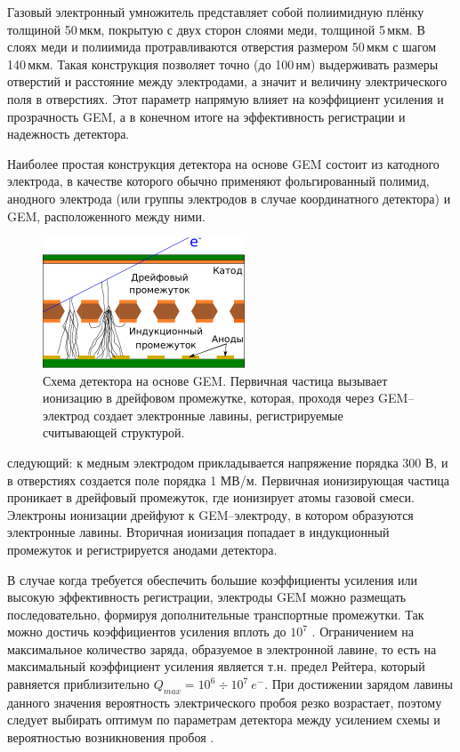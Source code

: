  Газовый электронный умножитель представляет собой полиимидную плёнку толщиной 50\,мкм, покрытую с двух сторон слоями меди, толщиной 5\,мкм. В слоях меди и полиимида протравливаются отверстия размером 50\,мкм с шагом 140\,мкм. Такая конструкция позволяет точно (до 100\,нм) выдерживать размеры отверстий и расстояние между электродами, а значит и величину электрического поля в отверстиях. Этот параметр напрямую влияет на коэффициент усиления и прозрачность GEM, а в конечном итоге на эффективность регистрации и надежность детектора.
 \par Наиболее простая конструкция детектора на основе  GEM состоит из катодного электрода, в качестве которого обычно применяют фольгированный полимид, анодного электрода (или группы электродов в случае координатного детектора) и GEM, расположенного между ними.
 \begin{figure}[h]
	\centering
	\includegraphics[height = 4 cm, width= 6cm]{img/GEM_scheme.pdf}
	\caption{Схема детектора на основе GEM. Первичная частица вызывает ионизацию в дрейфовом промежутке, которая, проходя через GEM--электрод создает электронные лавины, регистрируемые считывающей структурой.}
	\label{fig:single} 	
 \end{figure}
  следующий: к медным электродом прикладывается напряжение порядка 300 В, и в отверстиях создается поле порядка 1 МВ/м. Первичная ионизирующая частица проникает в дрейфовый промежуток, где ионизирует атомы газовой смеси. Электроны ионизации дрейфуют к GEM--электроду, в котором образуются электронные лавины. Вторичная ионизация попадает в индукционный промежуток и регистрируется анодами детектора.
 \par В случае когда требуется обеспечить большие коэффициенты усиления или высокую эффективность регистрации, электроды GEM можно размещать последовательно, формируя дополнительные транспортные промежутки. Так можно достичь коэффициентов усиления вплоть до $10^7$ \cite{sauli}. Ограничением на максимальное количество заряда, образуемое в электронной лавине, то есть на максимальный коэффициент усиления является т.н. предел Рейтера, который равняется приблизительно $Q_{max} = 10^6\div10^7~e^-$. При достижении зарядом лавины данного значения вероятность электрического пробоя резко возрастает, поэтому следует выбирать оптимум по параметрам детектора между усилением схемы и вероятностью возникновения пробоя \cite{peskov}. 
  
 



